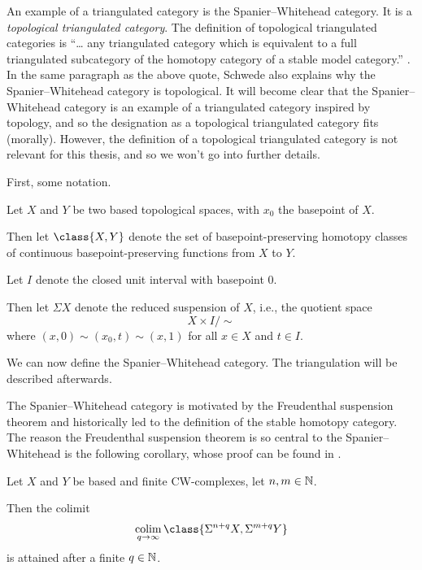 An example of a triangulated category is the Spanier--Whitehead category. It is a \emph{topological triangulated category}. The definition of topological triangulated categories is ``… any triangulated category which is equivalent to a full triangulated subcategory of the homotopy category of a stable model category.'' \cite[p. 6]{Schwede_2010}. In the same paragraph as the above quote, Schwede also explains why the Spanier--Whitehead category is topological. It will become clear that the Spanier--Whitehead category is an example of a triangulated category inspired by topology, and so the designation as a topological triangulated category fits (morally). However, the definition of a topological triangulated category is not relevant for this thesis, and so we won't go into further details. 

First, some notation.
\begin{notation}
    Let \( X \) and \( Y \) be two based topological spaces, with \( x_0 \) the basepoint of \( X \).

    Then let \( \class{ X, Y } \) denote the set of basepoint-preserving homotopy classes of continuous basepoint-preserving functions from \( X \) to \( Y \).

    Let \( I \) denote the closed unit interval with basepoint \( 0 \).

    Then let \( \Sigma X \) denote the reduced suspension of \( X \), i.e., the quotient space
    \[
        X \times I / \sim
    \]
    where \( (x, 0) \sim (x_0, t) \sim (x, 1) \) for all \( x \in X \)  and \( t \in I \).
\end{notation}

We can now define the Spanier--Whitehead category. The triangulation will be described afterwards.

The Spanier--Whitehead category is motivated by the Freudenthal suspension theorem and historically led to the definition of the stable homotopy category. The reason the Freudenthal suspension theorem is so central to the Spanier--Whitehead is the following corollary, whose proof can be found in \cite[Remark 5.2]{Daria_Bachelor}.

\begin{corollary}
    \label{cor:sw_freudenthal_suspension}
    Let \( X \) and \( Y \) be based and finite CW-complexes, let \( n, m \in {\mathbb{N}} \).
    
    Then the colimit
    \[
        \colim_{q \to \infty} \class{ \Sigma^{n + q} X, \Sigma^{m + q} Y }
    \]
    is attained after a finite \( q \in {\mathbb{N}} \).
\end{corollary}

